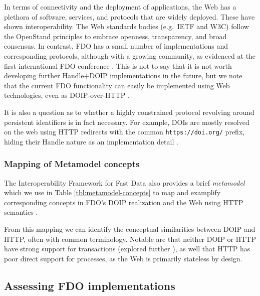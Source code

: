 \documentclass[fleqn,10pt,NOlineno]{wlpeerjlua}
\begin{document}
In terms of connectivity and the deployment of applications, the Web has a plethora of software, services, and protocols that are widely deployed. These have shown interoperability. The Web standards bodies (e.g.~IETF and W3C) follow the OpenStand principles \autocite{ModernStandardsParadigm} to embrace openness, transparency, and broad consensus. In contrast, FDO has a small number of implementations and corresponding protocols, although with a growing community, as evidenced at the first international FDO conference \autocite{looFirstInternationalConference2022}. This is not to say that it is not worth developing further Handle+DOIP implementations in the future, but we note that the current FDO functionality can easily be implemented using Web technologies, even as DOIP-over-HTTP \autocite{DOIPAPIHTTPa}.

It is also a question as to whether a highly constrained protocol revolving around persistent identifiers is in fact necessary. For example, DOIs are mostly resolved on the web \autocite{DOIResolutionDocumentation} using HTTP redirects with the common \texttt{https://doi.org/} prefix, hiding their Handle nature as an implementation detail \autocite{DOIHandbookResolution}.



\subsubsection*{Mapping of Metamodel concepts}\label{mapping-of-metamodel-concepts}

The Interoperability Framework for Fast Data also provides a brief \emph{metamodel} which we use in Table \vref{tbl:metamodel-concepts} to map and examplify corresponding concepts in FDO's DOIP realization and the Web using HTTP semantics \autocite{rfc9110}.

From this mapping we can identify the conceptual similarities between DOIP and HTTP, often with common terminology. Notable are that neither DOIP or HTTP have strong support for transactions (explored further ), as well that HTTP has poor direct support for processes, as the Web is primarily stateless by design.



\subsection*{Assessing FDO implementations}\label{sec:doip-fdo-compare}
\end{document}
